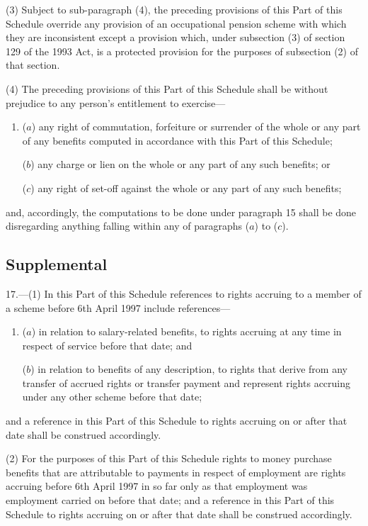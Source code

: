 \documentclass[12pt,a4paper]{article}
\begin{document}
(3) Subject to sub-paragraph (4), the preceding provisions of this Part of this Schedule override any provision of an occupational pension scheme with which they are inconsistent except a provision which, under subsection (3)  of section 129 of the 1993 Act, is a protected provision for the purposes of subsection (2)  of that section.

(4) The preceding provisions of this Part of this Schedule shall be without prejudice to any person’s entitlement to exercise—
\begin{enumerate}\item[]
($a$) any right of commutation, forfeiture or surrender of the whole or any part of any benefits computed in accordance with this Part of this Schedule;

($b$) any charge or lien on the whole or any part of any such benefits; or

($c$) any right of set-off against the whole or any part of any such benefits;
\end{enumerate}
and, accordingly, the computations to be done under paragraph 15 shall be done disregarding anything falling within any of paragraphs ($a$)  to ($c$).

\subsection*{Supplemental}

17.---(1) In this Part of this Schedule references to rights accruing to a member of a scheme before 6th April 1997 include references—
\begin{enumerate}\item[]
($a$) in relation to salary-related benefits, to rights accruing at any time in respect of service before that date; and

($b$) in relation to benefits of any description, to rights that derive from any transfer of accrued rights or transfer payment and represent rights accruing under any other scheme before that date;
\end{enumerate}
and a reference in this Part of this Schedule to rights accruing on or after that date shall be construed accordingly.

(2) For the purposes of this Part of this Schedule rights to money purchase benefits that are attributable to payments in respect of employment are rights accruing before 6th April 1997 in so far only as that employment was employment carried on before that date; and a reference in this Part of this Schedule to rights accruing on or after that date shall be construed accordingly.
\end{document}
